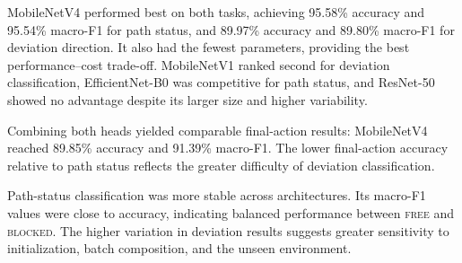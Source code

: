 ﻿MobileNetV4 performed best on both tasks, achieving 95.58\% accuracy and 95.54\% macro-F1 for path status, and 89.97\% accuracy and 89.80\% macro-F1 for deviation direction. It also had the fewest parameters, providing the best performance--cost trade-off. MobileNetV1 ranked second for deviation classification, EfficientNet-B0 was competitive for path status, and ResNet-50 showed no advantage despite its larger size and higher variability.

Combining both heads yielded comparable final-action results: MobileNetV4 reached 89.85\% accuracy and 91.39\% macro-F1. The lower final-action accuracy relative to path status reflects the greater difficulty of deviation classification.

Path-status classification was more stable across architectures. Its macro-F1 values were close to accuracy, indicating balanced performance between \textsc{free} and \textsc{blocked}. The higher variation in deviation results suggests greater sensitivity to initialization, batch composition, and the unseen environment.
